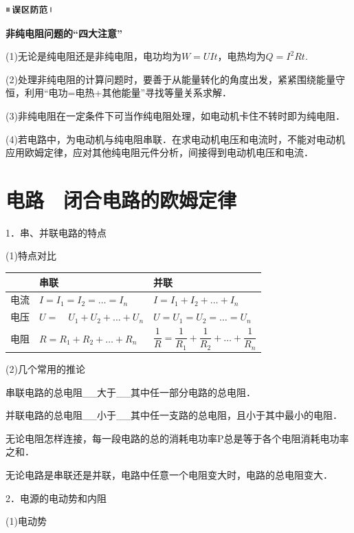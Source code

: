 \documentclass[cn,10.5pt,chinese,mac,chinesefont=founder]{elegantbook}
\begin{document}
\begin{center}\includegraphics[width=0.70764in,height=0.12292in]{media/image34.png}\end{center}
\begin{center}
	\textbf{非纯电阻问题的``四大注意''}
\end{center}



(1)无论是纯电阻还是非纯电阻，电功均为$W=UIt$，电热均为$Q=I^2Rt$.

(2)处理非纯电阻的计算问题时，要善于从能量转化的角度出发，紧紧围绕能量守恒，利用``电功=电热+其他能量''寻找等量关系求解．

(3)非纯电阻在一定条件下可当作纯电阻处理，如电动机卡住不转时即为纯电阻．

(4)若电路中，为电动机与纯电阻串联．在求电动机电压和电流时，不能对电动机应用欧姆定律，应对其他纯电阻元件分析，间接得到电动机电压和电流．

\newpage
\section{电路　闭合电路的欧姆定律}

1．串、并联电路的特点

(1)特点对比

\begin{longtable}[]{@{}m{1cm}m{6cm}m{6cm}@{}}
\toprule
& 串联 & 并联\tabularnewline
\midrule
\endhead
电流 & $I=I_{1}=I_{2}=\ldots=I_{n}$ &
$I=I_{1}+I_{2}+\ldots+I_{n}$\tabularnewline
电压 & $U=\quad U_{1}+U_{2}+\ldots+U_{n}$ &
$U=U_{1}=U_{2}=\ldots=U_{n}$\tabularnewline
电阻 & $R=R_{1}+R_{2}+\ldots+R_{n}$ &
$\dfrac{1}{R}=\dfrac{1}{R_{1}}+\dfrac{1}{R_{2}}+\ldots+\dfrac{1}{R_{n}}$\tabularnewline
\bottomrule
\end{longtable}

(2)几个常用的推论

串联电路的总电阻\_\_大于\_\_其中任一部分电路的总电阻．

并联电路的总电阻\_\_小于\_\_其中任一支路的总电阻，且小于其中最小的电阻．

无论电阻怎样连接，每一段电路的总的消耗电功率P总是等于各个电阻消耗电功率之和．

无论电路是串联还是并联，电路中任意一个电阻变大时，电路的总电阻变大．

2．电源的电动势和内阻

(1)电动势
\end{document}
